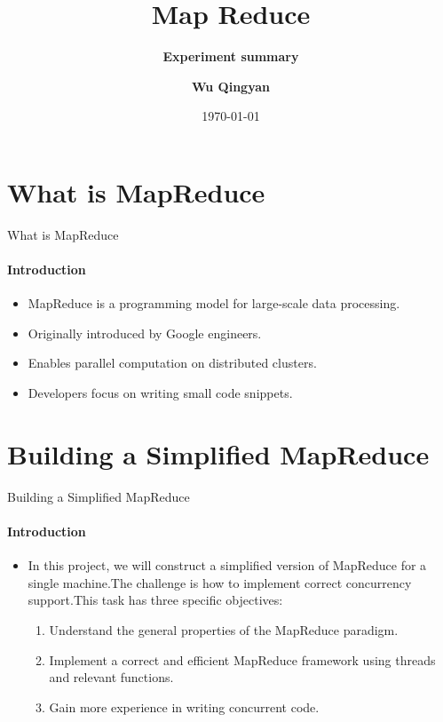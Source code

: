 \documentclass[10pt]{beamer}
\title[\textbf{Map Reduce}]{\textbf{Map Reduce}}
\subtitle{\textbf{Experiment summary}}
\author{\textbf{Wu Qingyan}}
\institute[CSE@SEU]{{213221715@seu.edu.cn}}
\date{\scriptsize \today}
\begin{document}
\begin{frame}[label=title]
    \titlepage{}
\end{frame}


\section[1.Intro]{What is MapReduce}
\begin{frame}{What is MapReduce}
    \framesubtitle{Introduction}
    \begin{itemize}
        \item MapReduce is a programming model for large-scale data processing.
        \item Originally introduced by Google engineers.
        \item Enables parallel computation on distributed clusters.
        \item Developers focus on writing small code snippets.
    \end{itemize}
\end{frame}

\section[2. Building a Simplified MapReduce]{Building a Simplified MapReduce}
\begin{frame}{Building a Simplified MapReduce}
    \framesubtitle{Introduction}
    \begin{itemize}
        \item In this project, we will construct a simplified version of MapReduce for a single machine.The challenge is how to implement correct concurrency support.This task has three specific objectives:

              \begin{enumerate}
                  \item Understand the general properties of the MapReduce paradigm.
                  \item Implement a correct and efficient MapReduce framework using threads and relevant functions.
                  \item Gain more experience in writing concurrent code.
              \end{enumerate}
    \end{itemize}
\end{frame}
\end{document}
